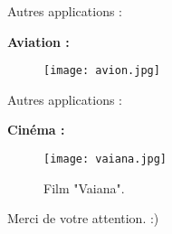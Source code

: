 \documentclass[11pt]{beamer}
\begin{document}

\begin{frame}{Autres applications :}

\textbf{Aviation :}
\begin{center}
\begin{figure}
\texttt{[image: avion.jpg]}
\end{figure}
\end{center}

\end{frame}


\begin{frame}{Autres applications :}

\textbf{Cinéma :}
\begin{center}
\begin{figure}
\texttt{[image: vaiana.jpg]}
\caption{Film "Vaiana".}
\end{figure}
\end{center}

\end{frame}



\begin{frame}
\begin{center}
Merci de votre attention. :)
\end{center}
\end{frame}
\end{document}

